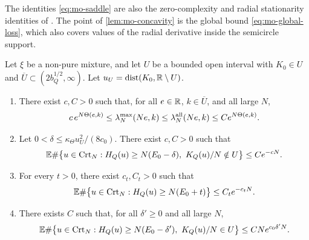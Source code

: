 The identities \eqref{eq:mo-saddle} are also the zero-complexity and radial stationarity identities of \cite[Lemma~3.18 and Lemma~5.2]{HuangSellke2024}. The point of \cref{lem:mo-concavity} is the global bound \eqref{eq:mo-global-loss}, which also covers values of the radial derivative inside the semicircle support.

\begin{lemma}\label{lem:mo-intensity-bounds}
Let $\xi$ be a non-pure mixture, and let $U$ be a bounded open interval with $K_0\in U$ and $\overline U\subset(2b_Q^{1/2},\infty)$. Let $u_U=\operatorname{dist}(K_0,\mathbb R\setminus U)$.
\begin{enumerate}
\item[(a)] There exist $c,C>0$ such that, for all $e\in\mathbb R$, $k\in\overline U$, and all large $N$,
\begin{equation}\label{eq:mo-bounded-intensity}
c\,e^{N\Theta(e,k)}\le\lambda_N^{\max}(Ne,k)\le\lambda_N^{\rm all}(Ne,k)\le Ce^{N\Theta(e,k)}.
\end{equation}
\item[(b)] Let $0<\delta\le\kappa_\Theta u_U^2/(8c_0)$. There exist $c,C>0$ such that
\begin{equation}\label{eq:mo-excluded}
\mathbb E\#\bigl\{u\in\mathrm{Crt}_N:H_Q(u)\ge N(E_0-\delta),\ K_Q(u)/N\notin U\bigr\}\le Ce^{-cN}.
\end{equation}
\item[(c)] For every $t>0$, there exist $c_t,C_t>0$ such that
\begin{equation}\label{eq:mo-coarse-upper}
\mathbb E\#\bigl\{u\in\mathrm{Crt}_N:H_Q(u)\ge N(E_0+t)\bigr\}\le C_te^{-c_tN}.
\end{equation}
\item[(d)] There exists $C$ such that, for all $\delta'\ge0$ and all large $N$,
\begin{equation}\label{eq:mo-coarse-count}
\mathbb E\#\bigl\{u\in\mathrm{Crt}_N:H_Q(u)\ge N(E_0-\delta'),\ K_Q(u)/N\in U\bigr\}\le CNe^{c_0\delta'N}.
\end{equation}
\end{enumerate}
\end{lemma}

